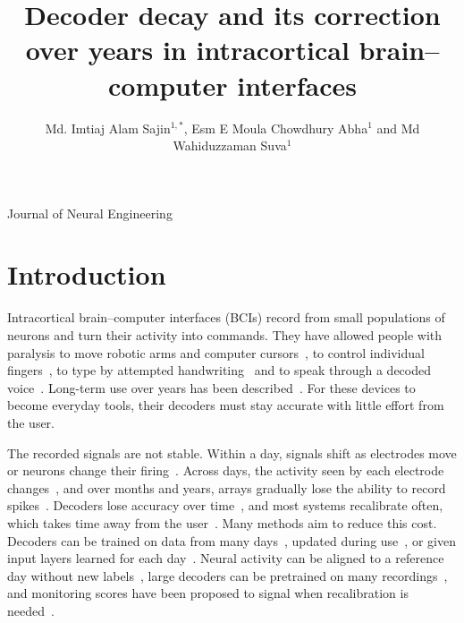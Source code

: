 \documentclass{iopjournal}
\renewcommand{\articletype}[1]{{\vspace*{-8mm}\noindent\Large\sf Journal of Neural Engineering}\par
  \vspace*{6mm}\noindent{\scriptsize\sf\bfseries\MakeUppercase{#1}}\par\vspace*{2mm}}
\begin{document}
\articletype{Paper}

\title{Decoder decay and its correction over years in intracortical brain--computer interfaces}

\author{Md. Imtiaj Alam Sajin$^{1,*}$, Esm E Moula Chowdhury
Abha$^{1}$ and Md Wahiduzzaman Suva$^{1}$}





\begin{abstract}

\end{abstract}

\linenumbers

\section{Introduction}
Intracortical brain--computer interfaces (BCIs) record from small populations of neurons and turn their activity into
commands. They have allowed people with paralysis to move robotic arms and computer cursors~\cite{hochberg2006,
hochberg2012,collinger2013,pandarinath2017}, to control individual fingers~\cite{willsey2025}, to type by attempted
handwriting~\cite{willett2021} and to speak through a decoded voice~\cite{willett2023,card2024,wairagkar2025}. Long-term use over years has been described~\cite{simeral2011,card2026}.
For these devices to become everyday tools, their decoders must stay accurate with little effort from the user.

The recorded signals are not stable. Within a day, signals shift as electrodes move or neurons change their
firing~\cite{perge2013}. Across days, the activity seen by each electrode changes~\cite{suner2005,chestek2011,
downey2018,bishop2014}, and over months and years, arrays gradually lose the ability to record spikes~\cite{barrese2013,
sponheim2021,bjanes2025,hahn2026}. Decoders lose accuracy over time~\cite{chestek2011,nuyujukian2014,
temmar2025,wilson2025}, and most systems recalibrate often, which takes time away from the user~\cite{jarosiewicz2013,
jarosiewicz2015,brandman2018}. Many methods aim to reduce this cost. Decoders can be trained on data from many
days~\cite{sussillo2016,natraj2025}, updated during use~\cite{jarosiewicz2015,orsborn2012,dangi2013,wilson2025}, or given input
layers learned for each day~\cite{willett2021,fan2023}. Neural activity can be aligned to a reference day without new
labels~\cite{degenhart2020,gallego2020,farshchian2019,ma2023,karpowicz2025,jude2022,wang2023erdiff}, large decoders
can be pretrained on many recordings~\cite{ye2023ndt2,azabou2023poyo,ryoo2025possm,ye2025ndt3}, and monitoring scores
have been proposed to
signal when recalibration is needed~\cite{pun2024}.
\end{document}
